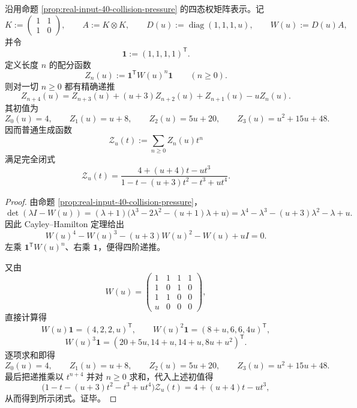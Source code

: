 \begin{conclusion}[碰撞势四态配分函数的四阶递推与有理生成函数]\label{con:xi-time-part62dga-collision-partition-recurrence-ogf}
沿用命题 \ref{prop:real-input-40-collision-pressure} 的四态权矩阵表示。记
\[
K:=
\begin{pmatrix}
1&1\\
1&0
\end{pmatrix},
\qquad
A:=K\otimes K,
\qquad
D(u):=\operatorname{diag}(1,1,1,u),
\qquad
W(u):=D(u)A,
\]
并令
\[
\mathbf 1:=(1,1,1,1)^{\mathsf T}.
\]
定义长度 \(n\) 的配分函数
\[
Z_n(u):=\mathbf 1^{\mathsf T}W(u)^n\mathbf 1
\qquad(n\ge 0).
\]
则对一切 \(n\ge 0\) 都有精确递推
\[
Z_{n+4}(u)
=
Z_{n+3}(u)+(u+3)Z_{n+2}(u)+Z_{n+1}(u)-uZ_n(u).
\]
其初值为
\[
Z_0(u)=4,\qquad
Z_1(u)=u+8,\qquad
Z_2(u)=5u+20,\qquad
Z_3(u)=u^2+15u+48.
\]
因而普通生成函数
\[
\mathcal Z_u(t):=\sum_{n\ge 0}Z_n(u)t^n
\]
满足完全闭式
\[
\mathcal Z_u(t)
=
\frac{4+(u+4)t-ut^3}{1-t-(u+3)t^2-t^3+ut^4}.
\]
\end{conclusion}
\begin{proof}
由命题 \ref{prop:real-input-40-collision-pressure}，
\[
\det(\lambda I-W(u))
=(\lambda+1)\bigl(\lambda^3-2\lambda^2-(u+1)\lambda+u\bigr)
=\lambda^4-\lambda^3-(u+3)\lambda^2-\lambda+u.
\]
因此 Cayley--Hamilton 定理给出
\[
W(u)^4-W(u)^3-(u+3)W(u)^2-W(u)+uI=0.
\]
左乘 \(\mathbf 1^{\mathsf T}W(u)^n\)、右乘 \(\mathbf 1\)，便得四阶递推。
\par
又由
\[
W(u)=
\begin{pmatrix}
1&1&1&1\\
1&0&1&0\\
1&1&0&0\\
u&0&0&0
\end{pmatrix},
\]
直接计算得
\[
W(u)\mathbf 1=(4,2,2,u)^{\mathsf T},
\qquad
W(u)^2\mathbf 1=(8+u,6,6,4u)^{\mathsf T},
\]
\[
W(u)^3\mathbf 1=(20+5u,14+u,14+u,8u+u^2)^{\mathsf T}.
\]
逐项求和即得
\[
Z_0(u)=4,\qquad
Z_1(u)=u+8,\qquad
Z_2(u)=5u+20,\qquad
Z_3(u)=u^2+15u+48.
\]
最后把递推乘以 \(t^{n+4}\) 并对 \(n\ge 0\) 求和，代入上述初值得
\[
\bigl(1-t-(u+3)t^2-t^3+ut^4\bigr)\mathcal Z_u(t)
=
4+(u+4)t-ut^3,
\]
从而得到所示闭式。证毕。
\end{proof}


